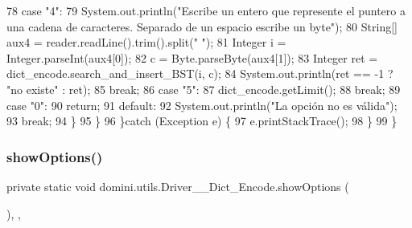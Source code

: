 \begin{DoxyCode}
78                 \textcolor{keywordflow}{case} \textcolor{stringliteral}{"4"}:
79                     System.out.println(\textcolor{stringliteral}{"Escribe un entero que represente el puntero a una cadena de
       caracteres. Separado de un espacio escribe un byte"});
80                     String[] aux4 = reader.readLine().trim().split(\textcolor{stringliteral}{" "});
81                     Integer i = Integer.parseInt(aux4[0]);
82                     c = Byte.parseByte(aux4[1]);
83                     Integer ret = dict\_encode.search\_and\_insert\_BST(i, c);
84                     System.out.println(ret == -1 ? \textcolor{stringliteral}{"no existe"} : ret);
85                 \textcolor{keywordflow}{break};
86                 \textcolor{keywordflow}{case} \textcolor{stringliteral}{"5"}:
87                     dict\_encode.getLimit();
88                 \textcolor{keywordflow}{break};
89                 \textcolor{keywordflow}{case} \textcolor{stringliteral}{"0"}:
90                     \textcolor{keywordflow}{return};
91                 \textcolor{keywordflow}{default}:
92                     System.out.println(\textcolor{stringliteral}{"La opción no es válida"});
93                 \textcolor{keywordflow}{break};
94             \}
95         \}
96     \}\textcolor{keywordflow}{catch} (Exception e) \{
97         e.printStackTrace();
98     \}
99     \}
\end{DoxyCode}
\mbox{\label{classdomini_1_1utils_1_1Driver____Dict__Encode_a8b24c280193457c6620b2b5906018c34}} 
\subsubsection{\texorpdfstring{show\+Options()}{showOptions()}}
{\footnotesize\ttfamily private static void domini.\+utils.\+Driver\+\_\+\+\_\+\+Dict\+\_\+\+Encode.\+show\+Options (\begin{DoxyParamCaption}{ }\end{DoxyParamCaption})\hspace{0.3cm}{\ttfamily [inline]}, {\ttfamily [static]}, {\ttfamily [private]}}



